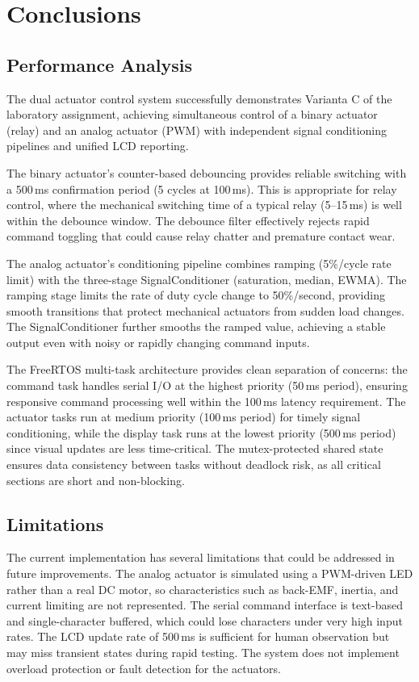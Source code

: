\section{Conclusions}

\subsection{Performance Analysis}

The dual actuator control system successfully demonstrates Varianta C of the laboratory assignment, achieving simultaneous control of a binary actuator (relay) and an analog actuator (PWM) with independent signal conditioning pipelines and unified LCD reporting.

The binary actuator's counter-based debouncing provides reliable switching with a 500\,ms confirmation period (5 cycles at 100\,ms). This is appropriate for relay control, where the mechanical switching time of a typical relay (5--15\,ms) is well within the debounce window. The debounce filter effectively rejects rapid command toggling that could cause relay chatter and premature contact wear.

The analog actuator's conditioning pipeline combines ramping (5\%/cycle rate limit) with the three-stage SignalConditioner (saturation, median, EWMA). The ramping stage limits the rate of duty cycle change to 50\%/second, providing smooth transitions that protect mechanical actuators from sudden load changes. The SignalConditioner further smooths the ramped value, achieving a stable output even with noisy or rapidly changing command inputs.

The FreeRTOS multi-task architecture provides clean separation of concerns: the command task handles serial I/O at the highest priority (50\,ms period), ensuring responsive command processing well within the 100\,ms latency requirement. The actuator tasks run at medium priority (100\,ms period) for timely signal conditioning, while the display task runs at the lowest priority (500\,ms period) since visual updates are less time-critical. The mutex-protected shared state ensures data consistency between tasks without deadlock risk, as all critical sections are short and non-blocking.

\subsection{Limitations}

The current implementation has several limitations that could be addressed in future improvements. The analog actuator is simulated using a PWM-driven LED rather than a real DC motor, so characteristics such as back-EMF, inertia, and current limiting are not represented. The serial command interface is text-based and single-character buffered, which could lose characters under very high input rates. The LCD update rate of 500\,ms is sufficient for human observation but may miss transient states during rapid testing. The system does not implement overload protection or fault detection for the actuators.

